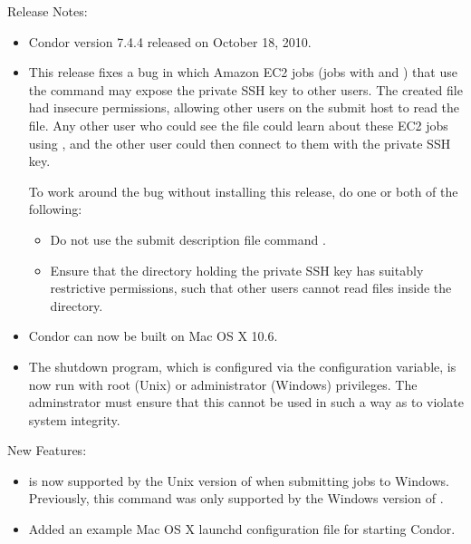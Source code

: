 \noindent Release Notes:

\begin{itemize}

\item Condor version 7.4.4 released on October 18, 2010.

\item \Security 
This release fixes a bug in which Amazon EC2 jobs
(jobs with  and )
that use the 
command may expose the private SSH key to other users.
The created file had insecure permissions,
allowing other users on the submit host to read the file.
Any other user who could see the file could learn about these EC2 jobs
using , 
and the other user could then connect to them with the private SSH key.

To work around the bug without installing this release,
do one or both of the following:
\begin{itemize}
\item Do not use the submit description file command
.
\item Ensure that the directory holding the private SSH key 
has suitably restrictive permissions,
such that other users cannot read files inside the directory.
\end{itemize}


\item Condor can now be built on Mac OS X 10.6.

\item The  shutdown program, which is configured via 
  the  configuration variable,
  is now run with root (Unix) or administrator (Windows) privileges.
  The adminstrator must ensure
  that this cannot be used in such a way as to violate system integrity.

\end{itemize}


\noindent New Features:

\begin{itemize}

\item {} is now supported by the Unix version of
 when submitting jobs to Windows.  Previously, this command
was only supported by the Windows version of .

\item Added an example Mac OS X launchd configuration file for starting Condor.

\end{itemize}

